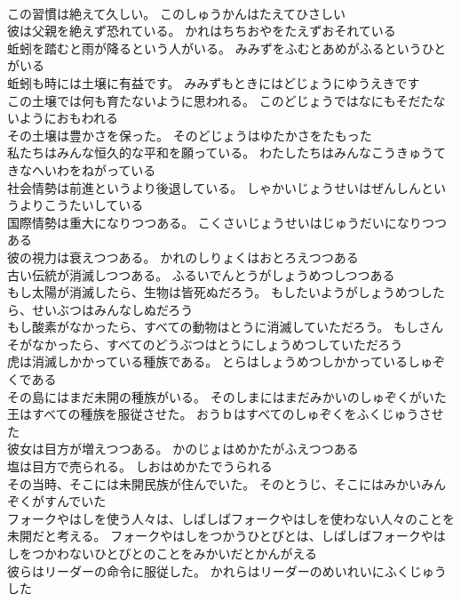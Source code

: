 \documentclass[8pt]{extreport}
\begin{document}
\begin{CJK}{UTF8}{min}
\\	この習慣は絶えて久しい。	このしゅうかんはたえてひさしい 
\\	彼は父親を絶えず恐れている。	かれはちちおやをたえずおそれている 
\\	蚯蚓を踏むと雨が降るという人がいる。	みみずをふむとあめがふるというひとがいる 
\\	蚯蚓も時には土壌に有益です。	みみずもときにはどじょうにゆうえきです 
\\	この土壌では何も育たないように思われる。	このどじょうではなにもそだたないようにおもわれる 
\\	その土壌は豊かさを保った。	そのどじょうはゆたかさをたもった 
\\	私たちはみんな恒久的な平和を願っている。	わたしたちはみんなこうきゅうてきなへいわをねがっている 
\\	社会情勢は前進というより後退している。	しゃかいじょうせいはぜんしんというよりこうたいしている 
\\	国際情勢は重大になりつつある。	こくさいじょうせいはじゅうだいになりつつある 
\\	彼の視力は衰えつつある。	かれのしりょくはおとろえつつある 
\\	古い伝統が消滅しつつある。	ふるいでんとうがしょうめつしつつある 
\\	もし太陽が消滅したら、生物は皆死ぬだろう。	もしたいようがしょうめつしたら、せいぶつはみんなしぬだろう 
\\	もし酸素がなかったら、すべての動物はとうに消滅していただろう。	もしさんそがなかったら、すべてのどうぶつはとうにしょうめつしていただろう 
\\	虎は消滅しかかっている種族である。	とらはしょうめつしかかっているしゅぞくである 
\\	その島にはまだ未開の種族がいる。	そのしまにはまだみかいのしゅぞくがいた 
\\	王はすべての種族を服従させた。	おうｂはすべてのしゅぞくをふくじゅうさせた 
\\	彼女は目方が増えつつある。	かのじょはめかたがふえつつある 
\\	塩は目方で売られる。	しおはめかたでうられる 
\\	その当時、そこには未開民族が住んでいた。	そのとうじ、そこにはみかいみんぞくがすんでいた 
\\	フォークやはしを使う人々は、しばしばフォークやはしを使わない人々のことを未開だと考える。	フォークやはしをつかうひとびとは、しばしばフォークやはしをつかわないひとびとのことをみかいだとかんがえる 
\\	彼らはリーダーの命令に服従した。	かれらはリーダーのめいれいにふくじゅうした 

\end{CJK}
\end{document}
